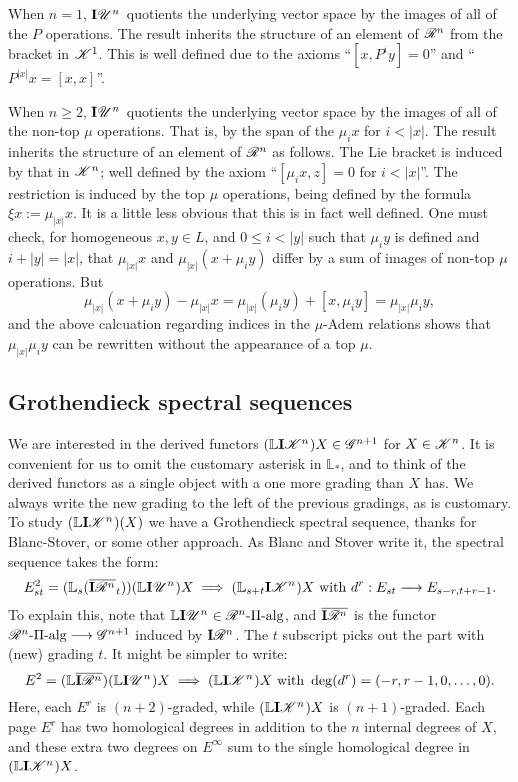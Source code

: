 \documentclass[11pt]{article}
\newcommand{\LL}[1]{{\scrK}^{#1}}%
\newcommand{\PR}[1]{\scrR^{#1}}%
\newcommand{\GR}[1]{\scrG^{#1}}%
\newcommand{\nontop}[1]{\scrU^{#1}}%
\newcommand{\PiAlg}[1]{#1\textup{-$\Pi$-alg}}
\newcommand{\restn}[1]{\xi{#1}}
\newcommand{\Ind}[2][]{\mathbf{I}{#2}_{#1}}%
\newcommand{\derived}{\mathbb{L}}
\begin{document}
When $n=1$, $\Ind{\nontop{n}}$ quotients the underlying vector space by the images of all of the $P$ operations. The result inherits the structure of an element of $\PR{n}$ from the bracket in $\LL{1}$. This is well defined due to the axioms ``$[x,P^iy]=0$'' and ``$P^{|x|}x=[x,x]$''. 

When $n\geq2$, $\Ind{\nontop{n}}$ quotients the underlying vector space by the images of all of the non-top $\mu$ operations. That is, by the span of the $\mu_ix$ for $i<|x|$. The result inherits the structure of an element of $\PR{n}$ as follows. The Lie bracket is induced by that in $\LL{n}$; well defined by the axiom ``$[\mu_i{x},z]=0$ for $i<|x|$''. The restriction is induced by the top $\mu$ operations, being defined by the formula $\restn{x}:=\mu_{|x|}x$. It is a little less obvious that this is in fact well defined. One must check, for homogeneous $x,y\in L$, and $0\leq i<|y|$ such that $\mu_iy$ is defined and $i+|y|=|x|$, that $\mu_{|x|}x$ and $\mu_{|x|}(x+\mu_iy)$ differ by a sum of images of non-top $\mu$ operations. But
\[\mu_{|x|}(x+\mu_iy)-\mu_{|x|}x=\mu_{|x|}(\mu_iy)+[x,\mu_iy]=\mu_{|x|}\mu_iy,\]
and the above calcuation regarding indices in the $\mu$-Adem relations shows that $\mu_{|x|}\mu_iy$ can be rewritten without the appearance of a top $\mu$.

\subsection*{Grothendieck spectral sequences}
We are interested in the derived functors $(\derived\Ind{\LL{n}})X\in\GR{n+1}$ for $X\in\LL{n}$. It is convenient for us to omit the customary asterisk in $\derived_*$, and to think of the derived functors as a single object with a one more grading than $X$ has. We always write the new grading to the left of the previous gradings, as is customary. To study $(\derived\Ind{\LL{n}})(X)$ we have a Grothendieck spectral sequence, thanks for Blanc-Stover, or some other approach. As Blanc and Stover write it, the spectral sequence takes the form:
\[E^2_{st}=(\derived_s(\overline{\Ind{\PR{n}}}_t))(\derived\Ind{\nontop{n}})X\implies(\derived_{s+t}\Ind{\LL{n}})X\textup{ with }d^{r}:E_{st}\to E_{s-r,t+r-1}.\]
To explain this, note that $\derived\Ind{\nontop{n}}\in\PiAlg{\PR{n}}$, and $\overline{\Ind{\PR{n}}}$ is the functor $\PiAlg{\PR{n}}\to\GR{n+1}$ induced by $\Ind{\PR{n}}$. The $t$ subscript picks out the part with (new) grading $t$. It might be simpler to write:
\[E^2=(\derived\overline{\Ind{\PR{n}}})(\derived\Ind{\nontop{n}})X\implies(\derived\Ind{\LL{n}})X\textup{ with }\deg(d^r)=(-r,r-1,0,\ldots,0).\]
Here, each $E^r$ is $(n+2)$-graded, while $(\derived\Ind{\LL{n}})X$ is $(n+1)$-graded. Each page $E^r$ has two homological degrees in addition to the $n$ internal degrees of $X$, and these extra two degrees on $E^\infty$ sum to the single homological degree in $(\derived\Ind{\LL{n}})X$.
\end{document}
